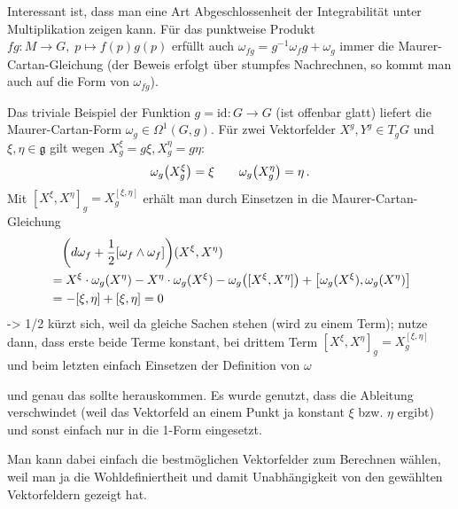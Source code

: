 \documentclass[../H_Analysis_main.tex]{subfiles}
\begin{document}
Interessant ist, dass man eine Art Abgeschlossenheit der Integrabilität unter Multiplikation zeigen kann. Für das punktweise Produkt $fg: M \rightarrow G, \; p \mapsto f(p) g(p)$ erfüllt auch $\omega_{fg} = g^{-1} \omega_f g + \omega_g$ immer die Maurer-Cartan-Gleichung (der Beweis erfolgt über stumpfes Nachrechnen, so kommt man auch auf die Form von $\omega_{fg}$).

\begin{bsp}
Das triviale Beispiel der Funktion $g = \text{id}: G \rightarrow G$ (ist offenbar glatt) liefert die Maurer-Cartan-Form $\omega_g \in \Omega^1(G, g)$. Für zwei Vektorfelder $X^g, Y^g \in T_g G$ und $\xi, \eta \in \mathfrak{g}$ gilt wegen $X_g^\xi = g \xi, X^\eta_g = g \eta$:
\begin{equation*}
\omega_g\qty(X^\xi_g) = \xi \qquad \omega_g\qty(X^\eta_g) = \eta \, .
\end{equation*}
Mit $[X^\xi, X^\eta]_g = X^{[\xi, \eta]}_g$ erhält man durch Einsetzen in die Maurer-Cartan-Gleichung
\begin{equation}
\begin{split}
& \quad \qty(d \omega_f + \frac{1}{2} \qty[\omega_f \wedge \omega_f])(X^\xi, X^\eta)
\\
&= X^\xi \cdot \omega_g(X^\eta) - X^\eta \cdot \omega_g(X^\xi) - \omega_g\qty([X^\xi, X^\eta]) + \qty[\omega_g(X^\xi), \omega_g(X^\eta)]
\\
&= - [\xi, \eta] + [\xi, \eta] = 0
\end{split}
\end{equation}
-> 1/2 kürzt sich, weil da gleiche Sachen stehen (wird zu einem Term); nutze dann, dass erste beide Terme konstant, bei drittem Term $[X^\xi, X^\eta]_g = X^{[\xi, \eta]}_g$ und beim letzten einfach Einsetzen der Definition von $\omega$

und genau das sollte herauskommen. Es wurde genutzt, dass die Ableitung verschwindet (weil das Vektorfeld an einem Punkt ja konstant $\xi$ bzw. $\eta$ ergibt) und sonst einfach nur in die 1-Form eingesetzt.

Man kann dabei einfach die bestmöglichen Vektorfelder zum Berechnen wählen, weil man ja die Wohldefiniertheit und damit Unabhängigkeit von den gewählten Vektorfeldern gezeigt hat.
\end{bsp}



\newpage
\end{document}
